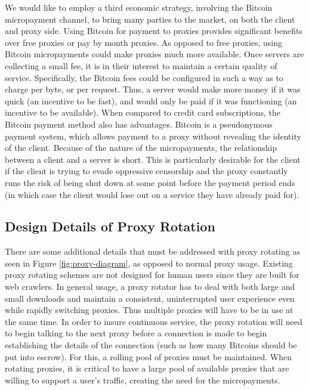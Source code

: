 We would like to employ a third economic strategy, involving the Bitcoin micropayment channel, to bring many parties to the market, on both the client and proxy side. Using Bitcoin for payment to proxies provides significant benefits over free proxies or pay by month proxies. As opposed to free proxies, using Bitcoin micropayments could make proxies much more available. Once servers are collecting a small fee, it is in their interest to maintain a certain quality of service. Specifically, the Bitcoin fees could be configured in such a way as to charge per byte, or per request. Thus, a server would make more money if it was quick (an incentive to be fast), and would only be paid if it was functioning (an incentive to be available). When compared to credit card subscriptions, the Bitcoin payment method also has advantages. Bitcoin is a pseudonymous payment system, which allows payment to a proxy without revealing the identity of the client. 
Because of the nature of the micropayments, the relationship between a client and a server is short. This is particularly desirable for the client if the client is trying to evade oppressive censorship and the proxy constantly runs the risk of being shut down at some point before the payment period ends (in which case the client would lose out on a service they have already paid for).

\subsection{Design Details of Proxy Rotation}

There are some additional details that must be addressed with proxy rotating as seen in Figure \ref{fig:proxy-diagram}, as opposed to normal proxy usage. Existing proxy rotating schemes are not designed for human users since they are built for web crawlers. In general usage, a proxy rotator has to deal with both large and small downloads and maintain a consistent, uninterrupted user experience even while rapidly switching proxies. Thus multiple proxies will have to be in use at the same time. In order to insure continuous service, the proxy rotation will need to begin talking to the next proxy before a connection is made to begin establishing the details of the connection (such as how many Bitcoins should be put into escrow). For this, a rolling pool of proxies must be maintained. When rotating proxies, it is critical to have a large pool of available proxies that are willing to support a user's traffic, creating the need for the micropayments.


